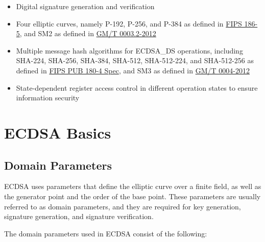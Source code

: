 \documentclass[main\_\_EN.tex]{subfiles}
\begin{document}
\begin{itemize}
    \item Digital signature generation and verification
    \item Four elliptic curves, namely P-192, P-256, and P-384 as defined in \href{https://nvlpubs.nist.gov/nistpubs/FIPS/NIST.FIPS.186-5.pdf}{FIPS 186-5}, and SM2 as defined in \href{http://www.gmbz.org.cn/file/2018-01-08/f60d13a3-e0fd-40d8-a80f-13fde691ef03.pdf}{GM/T 0003.2-2012}
    \item Multiple message hash algorithms for ECDSA\_DS operations, including SHA-224, SHA-256, SHA-384, SHA-512, SHA-512-224, and SHA-512-256 as defined in \href{https://doi.org/10.6028/NIST.FIPS.180-4}{FIPS PUB 180-4 Spec}, and SM3 as defined in \href{http://www.gmbz.org.cn/file/2018-01-08/6db059ec-61e1-4ff9-b112-ae15471ad6b5.PDF}{GM/T 0004-2012}
    \item State-dependent register access control in different operation states to ensure information security
\end{itemize}



\label{sec:ecdsa-terminology}

\section{ECDSA Basics}
\subsection{Domain Parameters}

ECDSA uses parameters that define the elliptic curve over a finite field, as well as the generator point and the order of the base point. These parameters are usually referred to as domain parameters, and they are required for key generation, signature generation, and signature verification.

The domain parameters used in ECDSA consist of the following:
\end{document}
